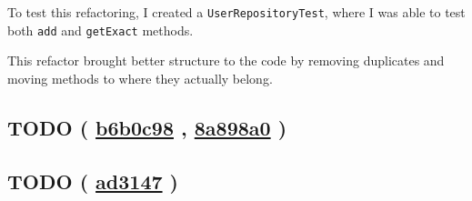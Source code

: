 \documentclass{article}
\newcommand{\code}[1]{\texttt{#1}}
\newcommand{\gh}[1]{%
  \href{https://github.com/awave1/assessment-loan-system/commit/#1}{#1}%
}
\begin{document}
To test this refactoring, I created a \code{UserRepositoryTest}, where I was able to test both \code{add} and \code{getExact} methods.

This refactor brought better structure to the code by removing duplicates and moving methods to where they actually belong.

\subsection*{TODO (\gh{b6b0c98}, \gh{8a898a0})}






\subsection*{TODO (\gh{ad3147})}





\end{document}
